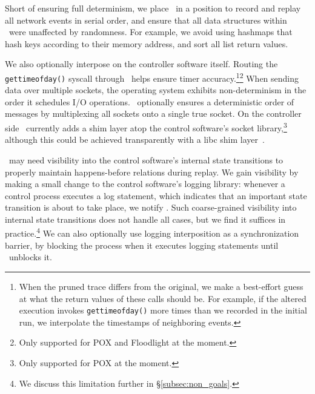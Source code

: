 Short of ensuring full determinism, we place \projectname~in a position to
record and replay all network events in serial order, and ensure that all
data structures within \projectname~were unaffected by randomness. For example,
we avoid using hashmaps that hash keys according to their memory address,
and sort all list return values.

We also optionally interpose on the controller software itself.
Routing the {\tt gettimeofday()} syscall through \projectname~helps ensure timer
accuracy.\footnote{When the pruned trace differs from the original, we make a
best-effort guess at what the return values of these calls should be. For example,
if the altered execution invokes {\tt gettimeofday()} more times than we recorded
in the initial run, we interpolate the timestamps of neighboring events.}\footnote{Only
supported for POX and Floodlight at the moment.\label{fn:pox_fl}} When sending data over multiple sockets, the operating system exhibits
non-determinism in the order it schedules I/O operations.
\projectname~optionally ensures a deterministic order of messages
by multiplexing all sockets
onto a single true socket. On the controller side \projectname~currently
adds a shim layer atop the control
software's socket library,\footnote{Only supported for POX at the moment.} although this
could be achieved transparently with a libc shim layer~\cite{Geels:2006:RDD:1267359.1267386}.

\projectname~may need visibility into the control software's internal state
transitions to properly maintain happens-before relations during replay. We
gain visibility by making a
small change to the control software's logging library: whenever a control process executes a log
statement, which indicates that an important state transition is about to take
place, we notify \projectname. Such coarse-grained visibility into internal
state transitions does not handle all cases, but we find it suffices in practice.\footnote{We discuss this limitation further in \S\ref{subsec:non_goals}.}
We can also optionally use
logging interposition as a
synchronization barrier, by blocking the process when it executes logging statements
until \projectname~unblocks it.


